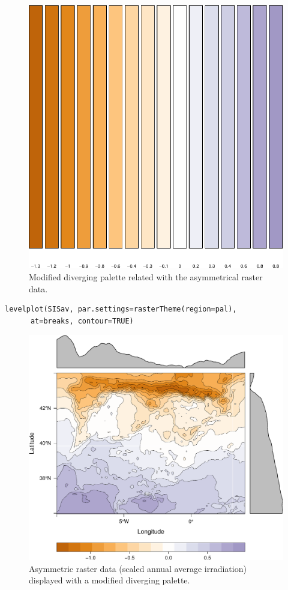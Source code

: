 \documentclass[smallroyalvopaper]{memoir}
\begin{document}
\begin{figure}[htb]
\centering
\includegraphics[height=0.3\textheight]{figs/showBreak2Pal.pdf}
\caption{\label{fig:showBreak2Pal}Modified diverging palette related with the asymmetrical raster data.}
\end{figure}


\lstset{language=R,numbers=none}
\begin{lstlisting}
levelplot(SISav, par.settings=rasterTheme(region=pal),
	  at=breaks, contour=TRUE)
\end{lstlisting}

\begin{figure}[htb]
\centering
\includegraphics[width=.9\linewidth]{figs/divPalSISav.pdf}
\caption{\label{fig:divPalSISav}Asymmetric raster data (scaled annual average irradiation) displayed with a modified diverging palette.}
\end{figure}
\end{document}
